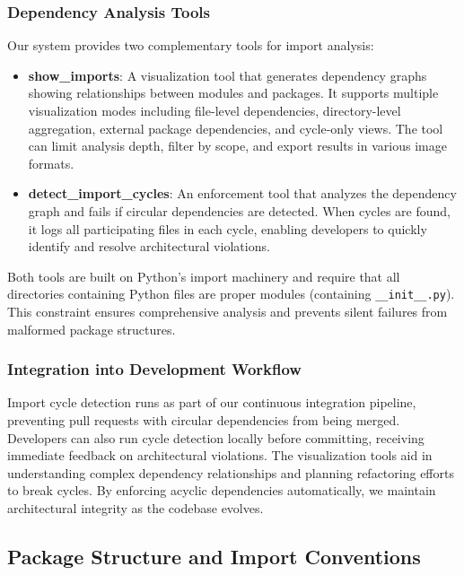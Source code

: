 \subsubsection{Dependency Analysis Tools}
Our system provides two complementary tools for import analysis:
\begin{itemize}
  \item \textbf{show\_imports}: A visualization tool that generates dependency
    graphs showing relationships between modules and packages. It
    supports multiple visualization modes including file-level
    dependencies, directory-level aggregation, external package
    dependencies, and cycle-only views. The tool can limit analysis
    depth, filter by scope, and export results in various image formats.

  \item \textbf{detect\_import\_cycles}: An enforcement tool that analyzes
    the dependency graph and fails if circular dependencies are detected.
    When cycles are found, it logs all participating files in each cycle,
    enabling developers to quickly identify and resolve architectural
    violations.
\end{itemize}

Both tools are built on Python's import machinery and require that all
directories containing Python files are proper modules (containing
\texttt{\_\_init\_\_.py}).
This constraint ensures comprehensive analysis and prevents silent
failures from malformed package structures.

\subsubsection{Integration into Development Workflow}
Import cycle detection runs as part of our continuous integration pipeline,
preventing pull requests with circular dependencies from being merged. Developers
can also run cycle detection locally before committing, receiving
immediate feedback on architectural violations. The visualization tools aid
in understanding complex dependency relationships and planning refactoring
efforts to break cycles. By enforcing acyclic dependencies automatically,
we maintain architectural integrity as the codebase evolves.

\subsection{Package Structure and Import Conventions}


